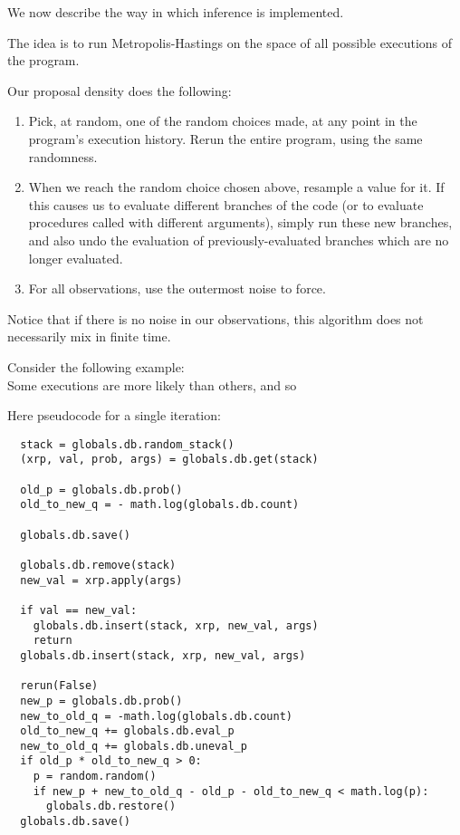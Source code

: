 \documentclass[11pt]{article}
\begin{document}
We now describe the way in which inference is implemented.  

The idea is to run Metropolis-Hastings on the space of all possible executions of the program.  

Our proposal density does the following:   
\begin{enumerate}
\item Pick, at random, one of the random choices made, at any point in the program's execution history.  Rerun the entire program, using the same randomness.  
\item When we reach the random choice chosen above, resample a value for it.  If this causes us to evaluate different branches of the code (or to evaluate procedures called with different arguments), simply run these new branches, and also undo the evaluation of previously-evaluated branches which are no longer evaluated.   
\item For all observations, use the outermost noise to force.  
\end{enumerate}

Notice that if there is no noise in our observations, this algorithm does not necessarily mix in finite time.  

Consider the following example: \\




Some executions are more likely than others, and so 

Here pseudocode for a single iteration:

\begin{verbatim}
  stack = globals.db.random_stack()
  (xrp, val, prob, args) = globals.db.get(stack)

  old_p = globals.db.prob()
  old_to_new_q = - math.log(globals.db.count)

  globals.db.save()

  globals.db.remove(stack)
  new_val = xrp.apply(args)

  if val == new_val:
    globals.db.insert(stack, xrp, new_val, args)
    return
  globals.db.insert(stack, xrp, new_val, args)

  rerun(False)
  new_p = globals.db.prob() 
  new_to_old_q = -math.log(globals.db.count) 
  old_to_new_q += globals.db.eval_p 
  new_to_old_q += globals.db.uneval_p 
  if old_p * old_to_new_q > 0:
    p = random.random()
    if new_p + new_to_old_q - old_p - old_to_new_q < math.log(p):
      globals.db.restore()
  globals.db.save()
\end{verbatim}


\pagebreak

\begin{thebibliography}{99}



\end{thebibliography}
\end{document}
